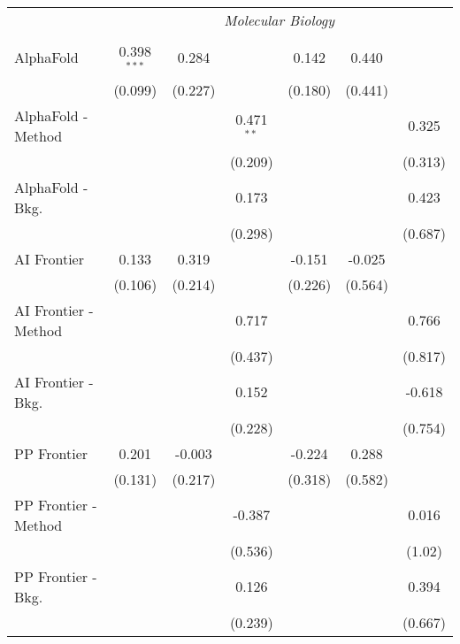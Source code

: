 \begin{tabular}{lcccccc}
 & \multicolumn{6}{c}{\textit{Molecular Biology}} \\ \\
   AlphaFold            & 0.398$^{***}$ & 0.284   &              & 0.142   & 0.440   &   \\   
                        & (0.099)       & (0.227) &              & (0.180) & (0.441) &   \\   
   AlphaFold - Method   &               &         & 0.471$^{**}$ &         &         & 0.325\\   
                        &               &         & (0.209)      &         &         & (0.313)\\   
   AlphaFold - Bkg.     &               &         & 0.173        &         &         & 0.423\\   
                        &               &         & (0.298)      &         &         & (0.687)\\   
   AI Frontier          & 0.133         & 0.319   &              & -0.151  & -0.025  &   \\   
                        & (0.106)       & (0.214) &              & (0.226) & (0.564) &   \\   
   AI Frontier - Method &               &         & 0.717        &         &         & 0.766\\   
                        &               &         & (0.437)      &         &         & (0.817)\\   
   AI Frontier - Bkg.   &               &         & 0.152        &         &         & -0.618\\   
                        &               &         & (0.228)      &         &         & (0.754)\\   
   PP Frontier          & 0.201         & -0.003  &              & -0.224  & 0.288   &   \\   
                        & (0.131)       & (0.217) &              & (0.318) & (0.582) &   \\   
   PP Frontier - Method &               &         & -0.387       &         &         & 0.016\\   
                        &               &         & (0.536)      &         &         & (1.02)\\   
   PP Frontier - Bkg.   &               &         & 0.126        &         &         & 0.394\\   
                        &               &         & (0.239)      &         &         & (0.667)\\   

\end{tabular}
